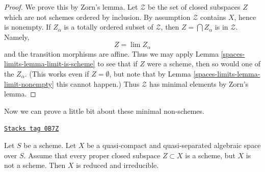 \begin{proof}
We prove this by Zorn's lemma. Let $\mathcal{Z}$ be the set
of closed subspaces $Z$ which are not schemes ordered by inclusion.
By assumption $\mathcal{Z}$ contains $X$, hence is nonempty.
If $Z_\alpha$ is a totally ordered subset of $\mathcal{Z}$, then
$Z = \bigcap Z_\alpha$ is in $\mathcal{Z}$. Namely,
$$
Z = \lim Z_\alpha
$$
and the transition morphisms are affine.
Thus we may apply Lemma \ref{spaces-limits-lemma-limit-is-scheme} to see that if $Z$
were a scheme, then so would one of the $Z_\alpha$.
(This works even if $Z = \emptyset$, but note that by
Lemma \ref{spaces-limits-lemma-limit-nonempty} this cannot happen.)
Thus $\mathcal{Z}$ has minimal elements by Zorn's lemma.
\end{proof}

Now we can prove a little bit about these minimal non-schemes.

\begin{lemma}
\label{spaces-limits-lemma-minimal-nonscheme}
\href{https://stacks.math.columbia.edu/tag/0B7Z}{\texttt{Stacks tag 0B7Z}}

Let $S$ be a scheme. Let $X$ be a quasi-compact and quasi-separated
algebraic space over $S$. Assume that every proper closed subspace
$Z \subset X$ is a scheme, but $X$ is not a scheme. Then $X$ is reduced
and irreducible.
\end{lemma}


